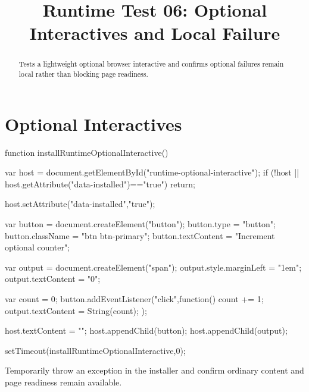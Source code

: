\documentclass{ximera}
\title{Runtime Test 06: Optional Interactives and Local Failure}
\begin{document}
\begin{abstract}
Tests a lightweight optional browser interactive and confirms optional failures
remain local rather than blocking page readiness.
\end{abstract}
\maketitle

\section{Optional Interactives}

\begin{javascript}
function installRuntimeOptionalInteractive() {
  var host = document.getElementById("runtime-optional-interactive");
  if (!host || host.getAttribute("data-installed")=="true")
    return;

  host.setAttribute("data-installed","true");

  var button = document.createElement("button");
  button.type = "button";
  button.className = "btn btn-primary";
  button.textContent = "Increment optional counter";

  var output = document.createElement("span");
  output.style.marginLeft = "1em";
  output.textContent = "0";

  var count = 0;
  button.addEventListener("click",function() {
    count += 1;
    output.textContent = String(count);
  });

  host.textContent = "";
  host.appendChild(button);
  host.appendChild(output);
}

setTimeout(installRuntimeOptionalInteractive,0);
\end{javascript}


Temporarily throw an exception in the installer and confirm ordinary content
and page readiness remain available.
\end{document}
